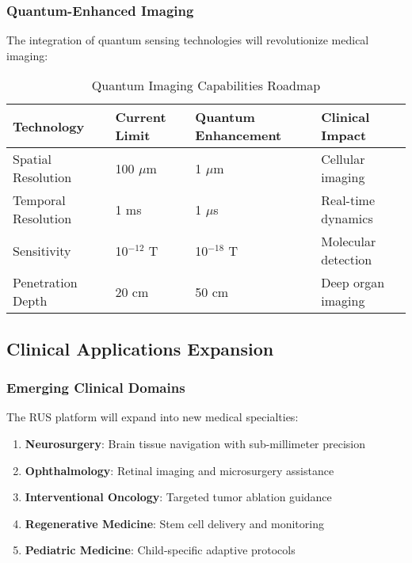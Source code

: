 \subsubsection{Quantum-Enhanced Imaging}
The integration of quantum sensing technologies will revolutionize medical imaging:

\begin{table}[htbp]
\centering
\caption{Quantum Imaging Capabilities Roadmap}
\label{tab:quantum-imaging}
\begin{tabular}{|l|l|l|l|}
\hline
\textbf{Technology} & \textbf{Current Limit} & \textbf{Quantum Enhancement} & \textbf{Clinical Impact} \\
\hline
Spatial Resolution & 100 $\mu$m & 1 $\mu$m & Cellular imaging \\
Temporal Resolution & 1 ms & 1 $\mu$s & Real-time dynamics \\
Sensitivity & 10$^{-12}$ T & 10$^{-18}$ T & Molecular detection \\
Penetration Depth & 20 cm & 50 cm & Deep organ imaging \\
\hline
\end{tabular}
\end{table}

\subsection{Clinical Applications Expansion}

\subsubsection{Emerging Clinical Domains}
The RUS platform will expand into new medical specialties:

\begin{enumerate}
    \item \textbf{Neurosurgery}: Brain tissue navigation with sub-millimeter precision
    \item \textbf{Ophthalmology}: Retinal imaging and microsurgery assistance
    \item \textbf{Interventional Oncology}: Targeted tumor ablation guidance
    \item \textbf{Regenerative Medicine}: Stem cell delivery and monitoring
    \item \textbf{Pediatric Medicine}: Child-specific adaptive protocols
\end{enumerate}

